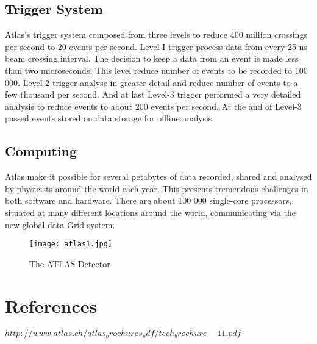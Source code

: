 \documentclass[a4paper,9pt]{article}
\begin{document}
\subsection{Trigger System}
 
Atlas's trigger system composed from three levels to reduce 400 million crossings per second to 20
events per second. Level-I trigger process data from every 25 ns beam crossing interval. The decision
to keep a data from an event is made less than two microseconds. This level reduce number of events
to be recorded to 100 000. Level-2 trigger analyse in greater detail and reduce number of events
to a few thousand per second. And at last Level-3 trigger performed a very detailed analysis to
reduce events to about 200 events per second. At the and of Level-3 passed events stored on data storage for offline analysis.
 
\subsection{Computing}
 
Atlas make it possible for several petabytes of data recorded, shared and analysed by physicists around
the world each year. This presents tremendous challenges in both software and hardware.
There are about 100 000 single-core processors, situated at many different locations around the world,
communicating via the new global data Grid system.

\begin{figure}[H]
\begin{center}
\texttt{[image: atlas1.jpg]}
\end{center}
\caption{ The ATLAS Detector }
\end{figure}

\section{References}

$http://www.atlas.ch/atlas_brochures_pdf/tech_brochure-11.pdf$
\end{document}

